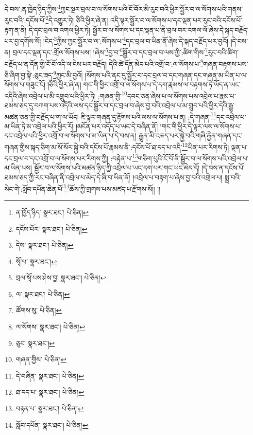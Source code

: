དེ་བས་:ན་ཁྱེད་ཉིད་ཀྱིས་\footnote{ན་ཁྱོད་ཉིད་  སྣར་ཐང་།  པེ་ཅིན། }ཀྱང་སྔར་བྲལ་བ་ལ་སོགས་པའི་ངོ་བོར་མི་རུང་བའི་ཕྱིར་སྦྱོར་བ་ལ་སོགས་པའི་གནས་རུང་བའི་:དངོས་པོ་\footnote{དངོས་པོར་  སྣར་ཐང་།  པེ་ཅིན། }དེ་འགྱུར་ཏེ། ཅིའི་ཕྱིར་ཞེ་ན། འདི་ལྟར་སྦྱོར་བ་ལ་སོགས་པ་དང་ལྡན་པར་རུང་བའི་དངོས་པོ་རྟག་ན་ནི། དེ་དང་བྲལ་བ་འགལ་ཕྱིར་ཏེ། སྦྱོར་བ་ལ་སོགས་པ་དང་ལྡན་པ་ནི་བྲལ་བར་འགལ་ལོ་ཞེས་དེ་སྐད་བརྗོད་པར་བྱ་དགོས་སོ། །ངེད་\footnote{དེས་  སྣར་ཐང་།  པེ་ཅིན། }ཀྱིས་ཀྱང་སྦྱོར་བ་ལ་:སོགས་པ་\footnote{སྭོ་པ་  སྣར་ཐང་། }དང་བྲལ་བ་ཡིན་ནོ་ཞེས་དེ་སྐད་བརྗོད་པར་བྱའོ། །དེ་བས་ན། བྲལ་དང་ལྡན་དང་:གྲོལ་སོགས་པས། །ཞེས་\footnote{བྲལ་སྭོ་པས་ཤེས་བྱ་  སྣར་ཐང་།  པེ་ཅིན། }བྱ་བ་\footnote{ལ་  སྣར་ཐང་།  པེ་ཅིན། }སྦྱོར་བ་དང་བྲལ་བ་ལས་ཀྱི་:ཚིག་གིས་\footnote{ཚོགས་སུ་  པེ་ཅིན། }རུང་བའི་ཚིག་བརྗོད་པ་ན་དོན་གྱི་ངོ་བོ་འདི་ལ་ངེས་པར་བརྗོད། དེའི་ཚེ་དོན་མེད་པའི་འགྲོ་བ་:ལ་སོགས་པ་\footnote{ལ་སོགས་  སྣར་ཐང་།  པེ་ཅིན། }གཞན་བརྟགས་པས་ཅི་ཞིག་བྱ་སྟེ་:ཅུང་ཟད་\footnote{ཅུང་  སྣར་ཐང་། }ཀྱང་མི་བྱའོ། །སོགས་པའི་ནང་དུ་སྦྱོར་བ་དང་བྲལ་བ་དང་གཞན་དང་གཞན་མ་ཡིན་པ་ལ་སོགས་པ་གཟུང་ངོ། །ཅིའི་ཕྱིར་ཞེ་ན། གང་གི་ཕྱིར་འགྲོ་བ་ལ་སོགས་པ་དེ་དག་རྣམས་ལ་བརྟགས་ཏེ་ཡོད་ན་ཡང་འདིའི་ཞེས་འབྲེལ་པ་མི་འགྲུབ་པའི་ཕྱིར་ཏེ། :གཞན་གྱི་\footnote{གཞན་གྱིས་  པེ་ཅིན། }དབང་ཅན་ཞེས་པ་ལ་སོགས་པས་འབྲེལ་པ་རྣམ་པ་ཐམས་ཅད་དུ་བཀག་པས་འདིའི་ལས་དང་སྦྱོར་བ་དང་བྲལ་བ་ཞེས་བྱ་བའི་འབྲེལ་པ་མ་གྲུབ་པའི་ཕྱིར་དེའི་རྒྱུ་མཚན་ཅན་གྱི་བརྗོད་པ་ག་ལ་ཡོད། ཇི་ལྟར་གཞན་དུ་རྟོགས་པའི་ལས་ལ་སོགས་པ་ན། :དེ་གཞན་\footnote{དེ་བཞིན་  སྣར་ཐང་།  པེ་ཅིན། }དང་འབྲེལ་པ་མ་ཡིན་ཏེ་མ་འབྲེལ་པའི་ཕྱིར་རོ། །མངོན་པར་འདོད་པ་ཡང་དེ་བཞིན་ནོ། །གང་གི་ཕྱིར་དེ་ལྟར་ལས་ལ་སོགས་པ་དང་འབྲེལ་པའི་ཕྱིར་འགྲོ་བ་ལ་སོགས་པ་མ་ཡིན་པ་དེ་བས་ན། རྒྱུན་མི་འཆད་པར་སྐྱེ་བའི་གཞི་རྐྱེན་གཞན་དང་གཞན་གྱིས་སྐད་ཅིག་མ་སོ་སོར་སྐྱེ་བའི་དངོས་པོ་རྣམས་ནི་:དངོས་པོ་ཐ་དད་པ་འདི་\footnote{ཐ་དད་པ་  སྣར་ཐང་།  པེ་ཅིན། }ཡིན་པར་རིགས་ཏེ། ལྡན་པ་དང་བྲལ་བ་དང་འགྲོ་བ་ལ་སོགས་པར་རིགས་ཀྱི། :བརྟེན་པ་\footnote{བརྟན་པ་  སྣར་ཐང་།  པེ་ཅིན། }གཅིག་པུའི་ངོ་བོ་ནི་སྦྱོར་བ་ལ་སོགས་པའི་འབྲེལ་པ་མ་ཡིན་པས། སྦྱོར་བ་ལ་སོགས་པའི་མཚན་ཉིད་ཀྱི་འབྲེལ་པ་ཡང་དག་པར་གང་ཡང་མེད་དོ། །དེ་བས་ན་དངོས་པོ་ཐམས་ཅད་ཀྱི་རང་བཞིན་ནི་འབྲེལ་པ་མེད་དེ་ཞི་བ་ཡིན་ནོ། །འབྲེལ་པ་བརྟག་པ་ཞེས་བྱ་བའི་འགྲེལ་པ། སྨྲ་བའི་སེང་གེ་:སློབ་དཔོན་ཆེན་པོ་\footnote{སློབ་དཔོན་  སྣར་ཐང་།  པེ་ཅིན། }ཆོས་ཀྱི་གྲགས་པས་མཛད་པ་རྫོགས་སོ།། །།